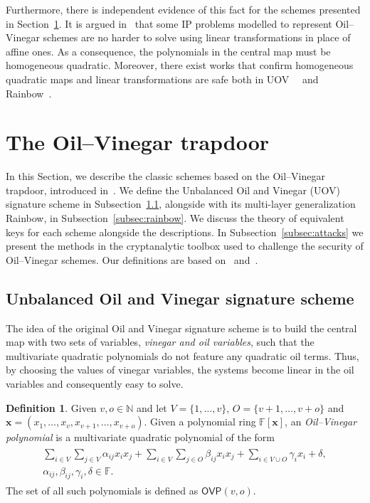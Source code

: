 \documentclass[draft, 12pt, a4paper, oneside]{memoir}
\theoremstyle{definition}
\newtheorem{definition}[theorem]{Definition}
\begin{document}
Furthermore, there is independent evidence of this fact for the schemes presented in Section~\ref{sec:ov}. It is argued in~\cite[Lemmata 3.2, 3.10, 3.19]{Thomae:201306} that some IP problems modelled to represent Oil--Vinegar schemes are no harder to solve using linear transformations in place of affine ones. As a consequence, the polynomials in the central map must be homogeneous quadratic. Moreover, there exist works that confirm homogeneous quadratic maps and linear transformations are safe both in UOV~\cite[Section 5]{Kipnis:199808}~\cite[Section 3.1]{Braeken:200502} and Rainbow~\cite[Section 3.1]{Ding:201901}.

\section{The Oil--Vinegar trapdoor}\label{sec:ov}

In this Section, we describe the classic schemes based on the Oil--Vinegar trapdoor, introduced in~\cite{Patarin:199709}. We define the Unbalanced Oil and Vinegar (UOV) signature scheme in Subsection~\ref{subsec:uov}, alongside with its multi-layer generalization Rainbow, in Subsection~\ref{subsec:rainbow}. We discuss the theory of equivalent keys for each scheme alongside the descriptions. In Subsection~\ref{subsec:attacks} we present the methods in the cryptanalytic toolbox used to challenge the security of Oil--Vinegar schemes. Our definitions are based on~\cite[Chapter 3]{Ding:2006} and~\cite[Chapter 3]{Petzoldt:201307}.

\subsection{Unbalanced Oil and Vinegar signature scheme}\label{subsec:uov}

The idea of the original Oil and Vinegar signature scheme is to build the central map with two sets of variables, \emph{vinegar and oil variables}, such that the multivariate quadratic polynomials do not feature any quadratic oil terms. Thus, by choosing the values of vinegar variables, the systems become linear in the oil variables and consequently easy to solve.

\begin{definition}\label{def:ovp}
  Given $v, o \in \mathbb{N}$ and let $V = \{1, \dots, v\}$, $O = \{v + 1, \dots, v + o\}$ and $\mathbf{x} = (x_{1}, \dots, x_{v}, x_{v + 1}, \dots, x_{v + o})$. Given a polynomial ring $\mathbb{F}[\mathbf{x}]$, an \emph{Oil--Vinegar polynomial} is a multivariate quadratic polynomial of the form
  \begin{align}
    \begin{split}
      \sum_{i \in V} \sum_{j \in V} \alpha_{ij} x_{i} x_{j}
        + \sum_{i \in V} \sum_{j \in O} \beta_{ij} x_{i} x_{j}
        + \sum_{i \in V \cup O} \gamma_{i} x_{i}
        + \delta, \\
      \alpha_{ij}, \beta_{ij}, \gamma_{i}, \delta \in \mathbb{F}.
    \end{split}
  \end{align}
  The set of all such polynomials is defined as $\mathsf{OVP}(v, o)$.
\end{definition}
\end{document}
